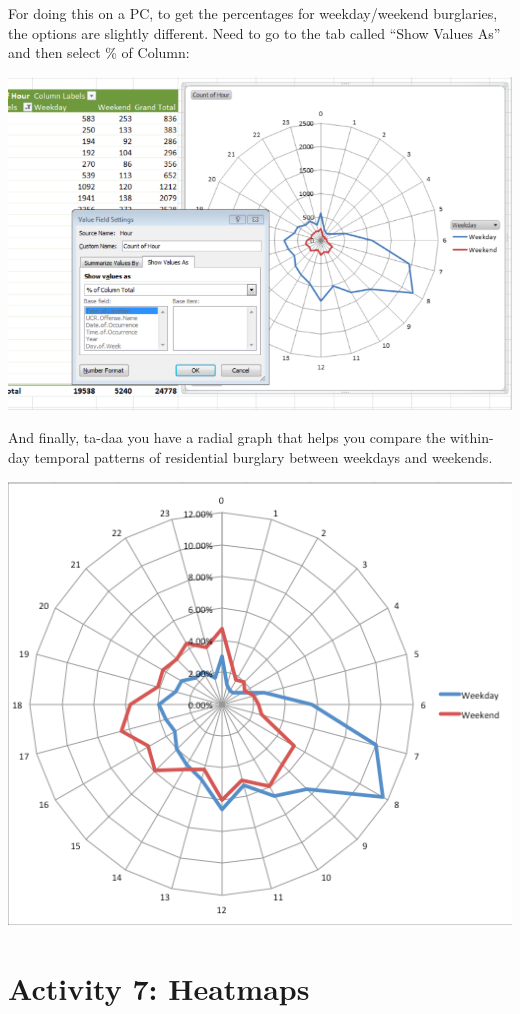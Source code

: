 \documentclass[]{book}
\theoremstyle{definition}
\theoremstyle{definition}
\theoremstyle{definition}
\theoremstyle{remark}
\begin{document}
For doing this on a PC, to get the percentages for weekday/weekend
burglaries, the options are slightly different. Need to go to the tab
called ``Show Values As'' and then select \% of Column:

\includegraphics{imgs/pc_radial.png}

And finally, ta-daa you have a radial graph that helps you compare the
within-day temporal patterns of residential burglary between weekdays
and weekends.

\includegraphics{imgs/hr_r_28.png}

\hypertarget{activity-7-heatmaps}{%
\section{Activity 7: Heatmaps}\label{activity-7-heatmaps}}
\end{document}

